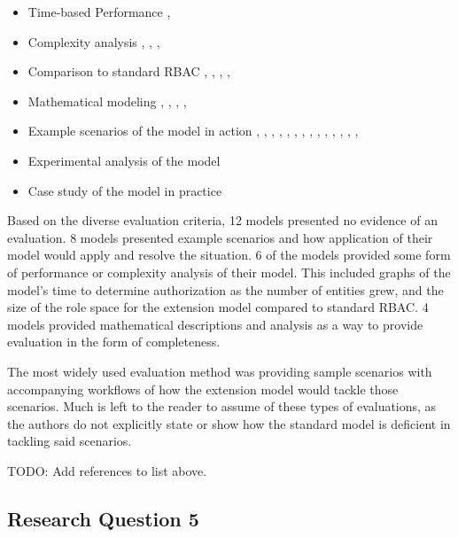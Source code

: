 \begin{itemize}
\item Time-based Performance \cite{ni2010privacy}, \cite{aich09:role}
\item Complexity analysis \cite{bao08:role}, \cite{zhang06:collaborative}, \cite{chen08:spatio-temporal}, \cite{aich09:role}
\item Comparison to standard RBAC \cite{bao08:role}, \cite{zou2009crbac}, \cite{zhang06:collaborative}, \cite{zhao2008flexible}, \cite{ray07:spatio}
\item Mathematical modeling \cite{damian2007geo}, \cite{hansen2003spatial}, \cite{aich07:STARBAC}, \cite{chen08:spatio-temporal}, \cite{joshi05:generalized}
\item Example scenarios of the model in action \cite{alam06:constraint}, \cite{tzelepi01:flexible}, \cite{cholewka00:acontext-sensitive}, \cite{huang06:pervasive}, \cite{bao08:role}, \cite{jian2008extended}, \cite{yamazaki104:designing}, \cite{zou2009crbac}, \cite{ray07:spatio}, \cite{samuel07:spatio-temporal}, \cite{ray07:spatio}, \cite{joshi05:generalized}, \cite{yao2008task}, \cite{zhou2007team}, \cite{oh2003task}
\item Experimental analysis of the model
\item Case study of the model in practice \cite{motta03:contextual}
\end{itemize}

Based on the diverse evaluation criteria, 12 models presented no evidence of an evaluation.  8 models presented example scenarios
and how application of their model would apply and resolve the situation.  6 of the models provided some form of performance
or complexity analysis of their model.  This included graphs of the model's time to determine authorization as the number of entities
grew, and the size of the role space for the extension model compared to standard RBAC. 4 models provided mathematical descriptions
and analysis as a way to provide evaluation in the form of completeness.

The most widely used evaluation method was providing sample scenarios with accompanying workflows of how the extension model
would tackle those scenarios.  Much is left to the reader to assume of these types of evaluations, as the authors do not explicitly state
or show how the standard model is deficient in tackling said scenarios.

TODO: Add references to list above.

\subsection{Research Question 5}

